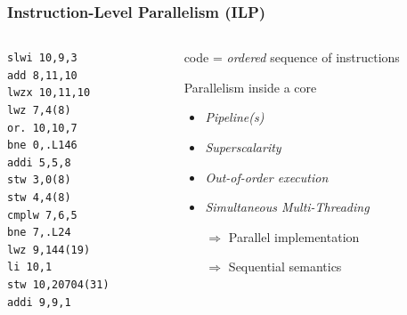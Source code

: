\documentclass[xcolor={x11names,svgnames,psnames}]{beamer}
\begin{document}
\begin{frame}[fragile]
  \frametitle{Instruction-Level Parallelism (ILP)}

  \begin{columns}
    \begin{column}{3cm}  
\begin{verbatim}
slwi 10,9,3
add 8,11,10
lwzx 10,11,10
lwz 7,4(8)
or. 10,10,7
bne 0,.L146
addi 5,5,8
stw 3,0(8)
stw 4,4(8)
cmplw 7,6,5
bne 7,.L24
lwz 9,144(19)
li 10,1
stw 10,20704(31)
addi 9,9,1
\end{verbatim}
    \end{column}  

    \begin{column}{7cm}
      code = \emph{ordered} sequence of instructions

      \medskip

      \begin{alertblock}{Parallelism inside a core}
      \begin{itemize}
      \item \emph{Pipeline(s)}
      \item \emph{Superscalarity}
      \item \emph{Out-of-order execution}
      \item \emph{Simultaneous Multi-Threading}
      \end{itemize}
    \end{alertblock}

    \begin{itemize}
    \item[$\Rightarrow$] Parallel implementation
    \item[$\Rightarrow$] Sequential semantics
    \end{itemize}
    
    \end{column}
  \end{columns}
\end{frame}

\end{document}
